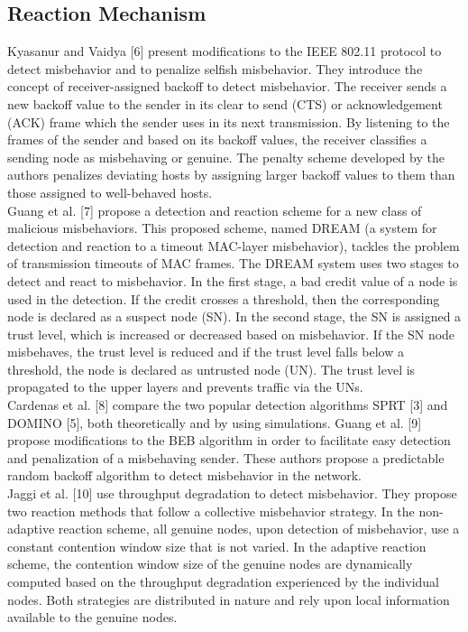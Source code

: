 \documentclass[12pt,letterpaper,english]{article}
\begin{document}
\subsection{Reaction Mechanism}
\indent Kyasanur and Vaidya 
[6] 
present modifications to the IEEE 802.11 protocol to detect misbehavior and to penalize selfish misbehavior. They introduce the concept of receiver-assigned backoff to detect misbehavior. The receiver sends a new backoff value to the sender in its clear to send (CTS) or acknowledgement (ACK) frame which the sender uses in its next transmission. By listening to the frames of the sender and based on its backoff values, the receiver classifies a sending node as misbehaving or genuine. The penalty scheme developed by the authors penalizes deviating hosts by assigning larger backoff values to them than those assigned to well-behaved hosts.
\\
\indent Guang et al. 
[7] 
propose a detection and reaction scheme for a new class of malicious misbehaviors. This proposed scheme, named DREAM (a system for detection and reaction to a timeout MAC-layer misbehavior), tackles the problem of transmission timeouts of MAC frames. The DREAM system uses two stages to detect and react to misbehavior. In the first stage, a bad credit value of a node is used in the detection. If the credit crosses a threshold, then the corresponding node is declared as a suspect node (SN). In the second stage, the SN is assigned a trust level, which is increased or decreased based on misbehavior. If the SN node misbehaves, the trust level is reduced and if the trust level falls below a threshold, the node is declared as untrusted node (UN). The trust level is propagated to the upper layers and prevents traffic via the UNs.
\\
\indent Cardenas et al. 
[8] 
compare the two popular detection algorithms SPRT 
[3] 
and DOMINO 
[5], 
both theoretically and by using simulations.
Guang et al. 
[9] 
propose modifications to the BEB algorithm in order to facilitate easy detection and penalization of a misbehaving sender. These authors propose a predictable random backoff algorithm to detect misbehavior in the network.
\\
\indent Jaggi et al. 
[10] 
use throughput degradation to detect misbehavior. They propose two reaction methods that follow a collective misbehavior strategy. In the non-adaptive reaction scheme, all genuine nodes, upon detection of misbehavior, use a constant contention window size that is not varied. In the adaptive reaction scheme, the contention window size of the genuine nodes are dynamically computed based on the throughput degradation experienced by the individual nodes. Both strategies are distributed in nature and rely upon local information available to the genuine nodes.
\end{document}
